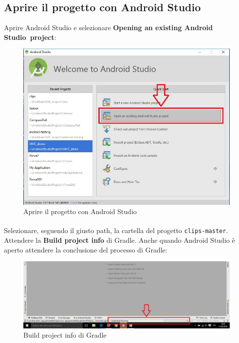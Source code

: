 \documentclass[../ManualeSviluppatore.tex]{subfiles}
\begin{document}
			
		
	\newpage	
	\subsection{Aprire il progetto con \gls{Android} Studio}
		Aprire \gls{Android Studio} e selezionare \textbf{Opening an existing \gls{Android Studio}\ 
project}:
		
		\begin{figure} [h]
			\centering
			\includegraphics[scale=0.5]{img/AprireProgetto}
			\caption{Aprire il progetto con \gls{Android} Studio}
			\label{fig:AprireProgetto}
		\end{figure}
		
		\paragraph*{}
			Selezionare, seguendo il giusto path, la cartella del progetto \verb|clips-master|. Attendere la \textbf{Build project info} di Gradle. Anche quando \gls{Android Studio} è aperto attendere la conclusione del processo di Gradle:
			
		\begin{figure} [h]
			\centering
			\includegraphics[width=\textwidth]{img/BuildGradleCut}
			\caption{Build project info di Gradle}
			\label{fig:BuildGradleCut}
		\end{figure}
		
\end{document}
